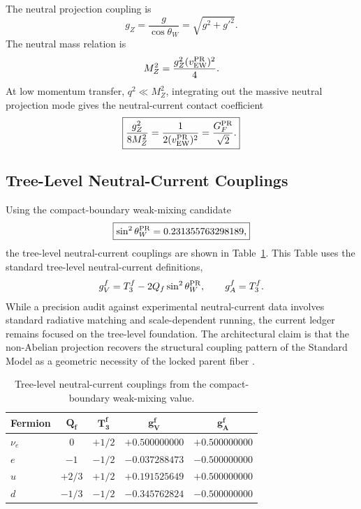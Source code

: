 \documentclass[11pt]{article}
\renewcommand{\arraystretch}{1.22}
\renewcommand{\arraystretch}{1.4}
\begin{document}
The neutral projection coupling is
\begin{equation}
g_Z
=
\frac{g}{\cos\theta_W}
=
\sqrt{g^2+g'^2}.
\end{equation}
The neutral mass relation is
\begin{equation}
M_Z^2
=
\frac{g_Z^2(v_{\rm EW}^{\rm PR})^2}{4}.
\end{equation}
At low momentum transfer, $q^2\ll M_Z^2$, integrating out the massive neutral projection mode gives the neutral-current contact coefficient
\begin{equation}
\boxed{
\frac{g_Z^2}{8M_Z^2}
=
\frac{1}{2(v_{\rm EW}^{\rm PR})^2}
=
\frac{G_F^{\rm PR}}{\sqrt2}.
}
\end{equation}

\subsection{Tree-Level Neutral-Current Couplings}
\label{sec:pr2_tree_level_neutral_current_couplings}

Using the compact-boundary weak-mixing candidate
\begin{equation}
\boxed{
\sin^2\theta_W^{\rm PR}
=
0.231355763298189,
}
\end{equation}
the tree-level neutral-current couplings are shown in Table~\ref{tab:pr2_neutral_current_couplings_main}. This Table uses the standard tree-level neutral-current definitions,
\begin{equation}
g_V^f
=
T_3^f
-
2Q_f\sin^2\theta_W^{\rm PR},
\qquad
g_A^f
=
T_3^f.
\end{equation}
While a precision audit against experimental neutral-current data involves standard radiative matching and scale-dependent running, the current ledger remains focused on the tree-level foundation. The architectural claim is that the non-Abelian projection recovers the structural coupling pattern of the Standard Model as a geometric necessity of the locked parent fiber \cite{Weinberg1979}.

\begin{table}[ht!]
\centering
\caption{Tree-level neutral-current couplings from the compact-boundary weak-mixing value.}
\label{tab:pr2_neutral_current_couplings_main}
\small
\renewcommand{\arraystretch}{1.2}
\begin{tabular}{lcccc}
\hline
\textbf{Fermion} & \(\boldsymbol{Q_f}\) & \(\boldsymbol{T_3^f}\) & \(\boldsymbol{g_V^f}\) & \(\boldsymbol{g_A^f}\) \\ \hline
\(\nu_e\) 
& \(0\) 
& \(+1/2\) 
& \(+0.500000000\) 
& \(+0.500000000\) \\

\(e\) 
& \(-1\) 
& \(-1/2\) 
& \(-0.037288473\) 
& \(-0.500000000\) \\

\(u\) 
& \(+2/3\) 
& \(+1/2\) 
& \(+0.191525649\) 
& \(+0.500000000\) \\

\(d\) 
& \(-1/3\) 
& \(-1/2\) 
& \(-0.345762824\) 
& \(-0.500000000\) \\ \hline
\end{tabular}
\end{table}
\end{document}

